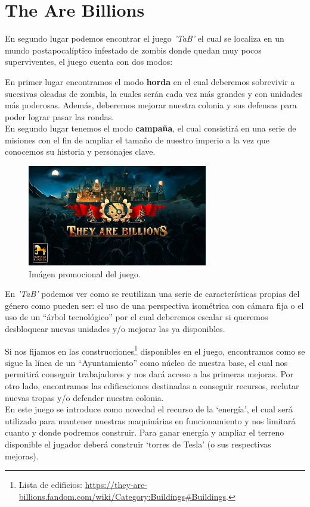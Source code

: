 \section{The Are Billions}
En segundo lugar podemos encontrar el juego \textit{'\acf{TaB}'} el cual se localiza en un
mundo postapocalíptico infestado de zombis donde quedan muy pocos superviventes, el juego
cuenta con dos modos:

En primer lugar encontramos el modo \textbf{horda} en el cual deberemos sobrevivir a
sucesivas oleadas de zombis, la cuales serán cada vez más grandes y con unidades más poderosas.
Además, deberemos mejorar nuestra colonia y sus defensas para poder lograr pasar las rondas.\\
En segundo lugar tenemos el modo \textbf{campaña}, el cual consistirá en una serie de misiones con el
fin de ampliar el tamaño de nuestro imperio a la vez que conocemos su historia y personajes
clave. 

\begin{figure}[ht]
\centering
\includegraphics[width=0.7\textwidth]{imagenes/marco_teo/referentes/tab_1.png}
\caption{Imágen promocional del juego.}
\label{img:tab_1}
\end{figure}

En \textit{'\ac{TaB}'} podemos ver como se reutilizan una serie de características propias
del género como pueden ser: el uso de una perspectiva isométrica con cámara fija o el uso de
un ``árbol tecnológico'' por el cual deberemos escalar si queremos desbloquear nuevas unidades
y/o mejorar las ya disponibles.

Si nos fijamos en las construcciones\footnote{Lista de edificios: \url{https://they-are-billions.fandom.com/wiki/Category:Buildings\#Buildings}.}
disponibles en el juego, encontramos como se sigue la línea de un ``Ayuntamiento'' como núcleo
de nuestra base, el cual nos permitirá conseguir trabajadores y nos dará acceso a las primeras
mejoras. Por otro lado, encontramos las edificaciones destinadas a conseguir recursos, reclutar
nuevas tropas y/o defender nuestra colonia. \\
En este juego se introduce como novedad el recurso de la `energía', el cual será utilizado
para mantener nuestras maquinárias en funcionamiento y nos limitará cuanto y donde podremos construir.  
Para ganar energía y ampliar el terreno disponible el jugador deberá construir `torres de Tesla' (o sus respectivas mejoras).


